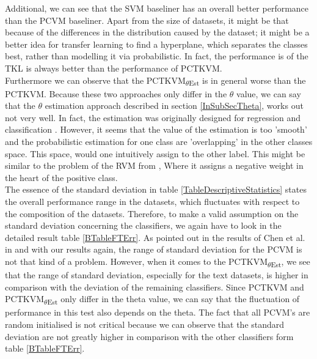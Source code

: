 Additional, we can see that the \acs{SVM} baseliner has an overall better performance than the \acs{PCVM} baseliner.
Apart from the size of datasets, it might be that because of the differences in the distribution caused by the dataset; it might be a better idea for transfer learning to find a hyperplane, which separates the classes best, rather than modelling it via probabilistic.
In fact, the performance is of the \acs{TKL} is always better than the performance of \acs{PCTKVM}.\\
Furthermore we can observe that the \acs{PCTKVM}\textsubscript{$\theta$Est} is in general worse than the \acs{PCTKVM}. 
Because these two approaches only differ in the $\theta$ value, we can say that the $\theta$ estimation approach described in section \ref{InSubSecTheta}, works out not very well.
In fact, the estimation was originally designed for regression and classification \cite{Kitayama.2011}. However, it seems that the value of the estimation is too 'smooth' and the probabilistic estimation for one class are 'overlapping' in the other classes space.
This space, would one intuitively assign to the other label.
This might be similar to the problem of the \acs{RVM} from \cite{Chen.2009}, Where it assigns a negative weight in the heart of the positive class.\\
The essence of the standard deviation in table \ref{TableDescriptiveStatistics} states the overall performance range in the datasets, which fluctuates with respect to the composition of the datasets.
Therefore, to make a valid assumption on the standard deviation concerning the classifiers, we again have to look in the detailed result table \ref{BTableFTErr}.
As pointed out in the results of Chen et al. in \cite{Chen.2009} and with our results again, the range of standard deviation for the \acs{PCVM} is not that kind of a problem. 
However, when it comes to the \acs{PCTKVM}\textsubscript{$\theta$Est}, we see that the range of standard deviation, especially for the text datasets, is higher in comparison with the deviation of the remaining classifiers.
Since \acs{PCTKVM} and \acs{PCTKVM}\textsubscript{$\theta$Est} only differ in the theta value, we can say that the fluctuation of performance in this test also depends on the theta.
The fact that all \acs{PCVM}'s are random initialised is not critical because we can observe that the standard deviation are not greatly higher in comparison with the other classifiers form table \ref{BTableFTErr}. 
